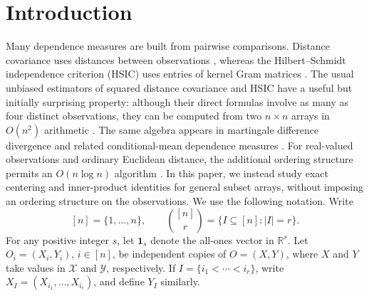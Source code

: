 \documentclass[11pt]{article}
\theoremstyle{plain}
\theoremstyle{definition}
\theoremstyle{remark}
\newcommand{\R}{\mathbb R}
\newcommand{\one}{\mathbf 1}
\begin{document}
\section{Introduction}
\label{sec:introduction}
Many dependence measures are built from pairwise comparisons.  Distance
covariance uses distances between observations
\citep{SzekelyRizzoBakirov2007}, whereas the Hilbert--Schmidt independence
criterion (HSIC) uses entries of kernel Gram matrices
\citep{GrettonEtAl2008,SejdinovicEtAl2013}.  The usual unbiased estimators of
squared distance covariance and HSIC have a useful but initially surprising
property: although their direct formulas involve as many as four distinct
observations, they can be computed from two $n\times n$ arrays in $O(n^2)$
arithmetic
\citep{SzekelyRizzo2014,SongEtAl2012}.  The same algebra appears in martingale
difference divergence and related conditional-mean dependence measures
\citep{ShaoZhang2014,ZhangYaoShao2018}.  For real-valued observations and ordinary
Euclidean distance, the additional ordering structure permits an
$O(n\log n)$ algorithm \citep{HuoSzekely2016}.  In this paper, we instead
study exact centering and inner-product identities for general subset arrays,
without imposing an ordering structure on the observations.  We use the
following notation.  Write
\[
 [n]=\{1,\ldots,n\},
 \qquad
 \binom{[n]}r=\{I\subseteq[n]:|I|=r\}.
\]
For any positive integer $s$, let $\one_s$ denote the all-ones vector in
$\R^s$.
Let $O_i=(X_i,Y_i)$, $i\in[n]$, be independent copies of $O=(X,Y)$, where
$X$ and $Y$ take values in $\mathcal X$ and $\mathcal Y$, respectively.  If
$I=\{i_1<\cdots<i_r\}$, write
$X_I=(X_{i_1},\ldots,X_{i_r})$, and define $Y_I$ similarly.
\end{document}
